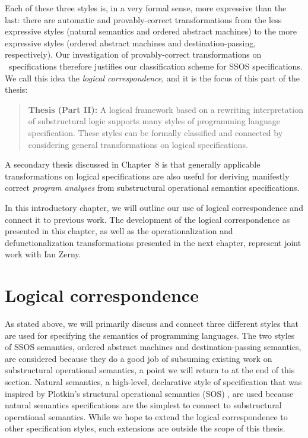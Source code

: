 \noindent
Each of these three styles is, in a very formal sense, more
expressive than the last: there are automatic and
provably-correct transformations from the less expressive styles
(natural semantics and ordered abstract machines) to the more
expressive styles (ordered abstract machines and destination-passing,
respectively).  Our investigation of provably-correct transformations
on \sls~specifications therefore justifies our classification scheme
for SSOS specifications. We call this idea the {\it logical
  correspondence}, and it is the focus of this part of the thesis:

\smallskip
\begin{quote} 
  {\bf Thesis (Part II):} A logical framework based on a rewriting
  interpretation of substructural logic supports many styles of
  programming language specification. These styles can be formally
  classified and connected by considering general transformations on
  logical specifications.
\end{quote} 

\noindent
A secondary thesis discussed in Chapter~8 is that generally
applicable transformations on logical specifications are also useful
for deriving manifestly correct {\it program analyses} from
substructural operational semantics specifications.


In this introductory chapter, we will outline our use of logical
correspondence and connect it to previous work. The development of the
logical correspondence as presented in this chapter, as well as the
operationalization and defunctionalization transformations presented
in the next chapter, represent joint work with Ian Zerny.



\section{Logical correspondence}

As stated above, we will primarily discuss and connect three different
styles that are used for specifying the semantics of programming
languages. The two styles of SSOS semantics, ordered abstract machines
and destination-passing semantics, are considered because they do a
good job of subsuming existing work on substructural operational
semantics, a point we will return to at the end of this
section. Natural semantics, a high-level, declarative style of
specification that was inspired by Plotkin's structural operational
semantics (SOS) \cite{plotkin04structural,kahn87natural}, are used
because natural semantics specifications are the simplest to connect
to substructural operational semantics. While we hope to extend the
logical correspondence to other specification styles, such extensions
are outside the scope of this thesis.

